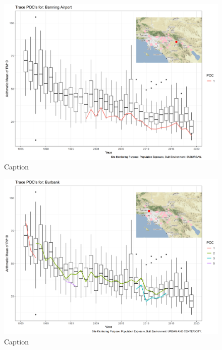 \begin{figure}
    \centering
    \includegraphics[width = \textwidth]{Figures/IndividualSiteTraces/TracePOC_Banning Airport.png}
    \caption{Caption}
    \label{fig:my_label}
\end{figure}

\begin{figure}
    \centering
    \includegraphics[width = \textwidth]{Figures/IndividualSiteTraces/TracePOC_Burbank.png}
    \caption{Caption}
    \label{fig:my_label}
\end{figure}

